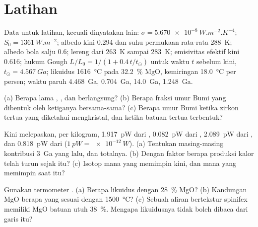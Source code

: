 \section*{Latihan}\label{sec:b2:precambrian-earth:exercises}

Data untuk latihan, kecuali dinyatakan lain: $\sigma = \qty{5.670e-8}{W.m^{-2}.K^{-4}}$;
$S_0 = \qty{1361}{W.m^{-2}}$; albedo kini 0.294 dan suhu permukaan rata-rata \qty{288}{K};
albedo bola salju 0.6; lereng dari \qty{263}{K} sampai \qty{283}{K}; emisivitas efektif kini
0.616; hukum Gough $L/L_0 = 1/(1 + 0.4\,t/t_\odot)$ untuk waktu $t$ sebelum kini, $t_\odot =
\qty{4.567}{Ga}$; likuidus  \qty{1616}{\celsius} pada \qty{32.2}{\percent} MgO,
kemiringan \qty{18.0}{\celsius} per persen; waktu paruh  \qty{4.468}{Ga}, 
\qty{0.704}{Ga},  \qty{14.0}{Ga},  \qty{1.248}{Ga}.

\begin{exercise}[$\star$]\label{exo:b2:precambrian-earth:1}
(a) Berapa lama , , dan  berlangsung? (b) Berapa fraksi umur
Bumi yang dibentuk oleh ketiganya bersama-sama? (c) Berapa umur Bumi ketika zirkon tertua yang diketahui
mengkristal, dan ketika batuan tertua terbentuk?
\end{exercise}

\begin{exercise}[$\star$]\label{exo:b2:precambrian-earth:2}
Kini  melepaskan, per kilogram, \qty{1.917}{pW} dari ,
\qty{0.082}{pW} dari , \qty{2.089}{pW} dari , dan \qty{0.818}{pW} dari
 ($\qty{1}{pW} = \qty{e-12}{W}$). (a) Tentukan masing-masing kontribusi \qty{3}{Ga} yang lalu, dan
totalnya. (b) Dengan faktor berapa produksi kalor telah turun sejak itu? (c) Isotop mana yang memimpin
kini, dan mana yang memimpin saat itu?
\end{exercise}

\begin{exercise}[$\star$]\label{exo:b2:precambrian-earth:3}
Gunakan termometer . (a) Berapa likuidus  dengan
\qty{28}{\percent} MgO? (b) Kandungan MgO berapa yang sesuai dengan \qty{1500}{\celsius}? (c) Sebuah
aliran bertekstur spinifex memiliki MgO batuan utuh \qty{38}{\percent}. Mengapa likuidusnya tidak boleh
dibaca dari garis itu?
\end{exercise}

